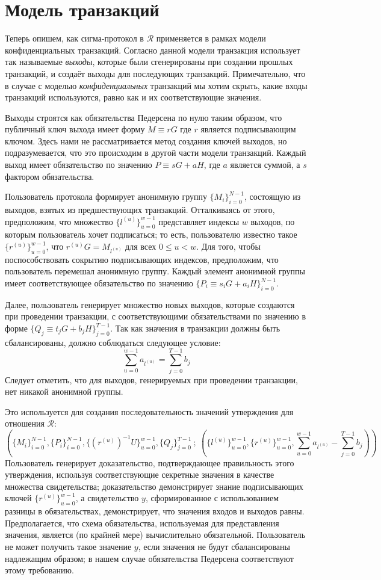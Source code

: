 \documentclass{article}
\newcommand{\sumu}{\sum_{u=0}^{w-1}}
\theoremstyle{definition}
\begin{document}
\section{Модель транзакций}
Теперь опишем, как сигма-протокол в $\mathcal{R}$ применяется в рамках модели конфиденциальных транзакций. Согласно данной модели транзакция использует так называемые \textit{выходы}, которые были сгенерированы при создании прошлых транзакций, и создаёт выходы для последующих транзакций.
Примечательно, что в случае с моделью \textit{конфиденциальных} транзакций мы хотим скрыть, какие входы транзакций используются, равно как и их соответствующие значения.

Выходы строятся как обязательства Педерсена по нулю таким образом, что публичный ключ выхода имеет форму $M \equiv rG$ где $r$ является подписывающим ключом.
Здесь нами не рассматривается метод создания ключей выходов, но подразумевается, что это происходим в другой части модели транзакций.
Каждый выход имеет обязательство по значению $P \equiv sG + aH$, где $a$ является суммой, а $s$ фактором обязательства.

Пользователь протокола формирует анонимную группу $\{M_i\}_{i=0}^{N-1}$, состоящую из выходов, взятых из предшествующих транзакций.
Отталкиваясь от этого, предположим, что множество $\{l^{(u)}\}_{u=0}^{w-1}$ представляет индексы $w$ выходов, по которым пользователь хочет подписаться; то есть, пользователю известно такое $\{r^{(u)}\}_{u=0}^{w-1}$, что $r^{(u)}G = M_{l^{(u)}}$ для всех $0 \leq u < w$.
Для того, чтобы поспособствовать сокрытию подписывающих индексов, предположим, что пользователь перемешал анонимную группу.
Каждый элемент анонимной группы имеет соответствующее обязательство по значению $\{P_i \equiv s_iG + a_iH\}_{i=0}^{N-1}$.

Далее, пользователь генерирует множество новых выходов, которые создаются при проведении транзакции, с соответствующими обязательствами по значению в форме $\{Q_j \equiv t_jG + b_jH\}_{j=0}^{T-1}$.
Так как значения в транзакции должны быть сбалансированы, должно соблюдаться следующее условие: $$\sum_{u=0}^{w-1} a_{l^{(u)}} = \sum_{j=0}^{T-1} b_j$$
Следует отметить, что для выходов, генерируемых при проведении транзакции, нет никакой анонимной группы.

Это используется для создания последовательность значений утверждения для отношения $\mathcal{R}$:
$$\left( \{M_i\}_{i=0}^{N-1}, \{P_i\}_{i=0}^{N-1}, \{(r^{(u)})^{-1}U\}_{u=0}^{w-1}, \{Q_j\}_{j=0}^{T-1} \: ; \: \left( \{l^{(u)}\}_{u=0}^{w-1}, \{r^{(u)}\}_{u=0}^{w-1}, \sumu a_{l^{(u)}} - \sum_{j=0}^{T-1} b_j \right) \right)$$
Пользователь генерирует доказательство, подтверждающее правильность этого утверждения, используя соответствующие секретные значения в качестве множества свидетельства; доказательство демонстрирует знание подписывающих ключей $\{r^{(u)}\}_{u=0}^{w-1}$, а свидетельство $y$, сформированное с использованием разницы в обязательствах, демонстрирует, что значения входов и выходов равны.
Предполагается, что схема обязательства, используемая для представления значения, является (по крайней мере) вычислительно обязательной. Пользователь не может получить такое значение $y$, если значения не будут сбалансированы надлежащим образом; в нашем случае обязательства Педерсена соответствуют этому требованию.
\end{document}
